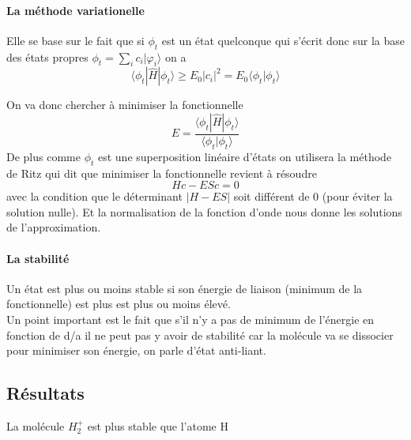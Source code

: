 \paragraph{La méthode variationelle}

Elle se base sur le fait que si $\phi_t$ est un état quelconque qui s'écrit donc sur la base des états propres $\phi_t=\sum_i c_i |\varphi_i \rangle$ on a 
\[
	\langle \phi_t|\hat{H}|\phi_t \rangle \geq E_0 |c_i|^2=E_0\langle \phi_t|\phi_t \rangle
\]

On va donc chercher à minimiser la fonctionnelle 
\[
	E=\frac{\langle \phi_t|\hat{H}|\phi_t \rangle}{\langle \phi_t|\phi_t \rangle}
\]
De plus comme $\phi_t$ est une superposition linéaire d'états on utilisera la méthode de Ritz qui dit que minimiser la fonctionnelle revient à résoudre
\[
	Hc-ESc=0
\]
avec la condition que le déterminant $|H-ES|$ soit différent de 0 (pour éviter la solution nulle). Et la normalisation de la fonction d'onde nous donne les solutions de l'approximation.


\paragraph{La stabilité}

Un état est plus ou moins stable si son énergie de liaison (minimum de la fonctionnelle) est plus est plus ou moins élevé.\\
Un point important est le fait que s'il n'y a pas de minimum de l'énergie en fonction de d/a il ne peut pas y avoir de stabilité car la molécule va se dissocier pour minimiser son énergie, on parle d'état anti-liant. 


\subsection{Résultats}


La molécule $H_2^+$ est plus stable que l'atome H